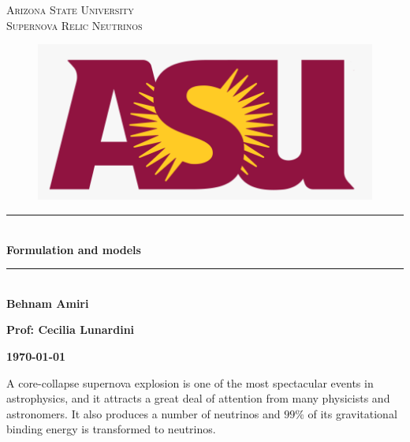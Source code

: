 \documentclass[fleqn]{article}
\begin{document}
  \begin{titlepage}

    \newcommand{\HRule}{\rule{\linewidth}{0.5mm}}

    \center

    \textsc{\LARGE Arizona State University}\\[1.5cm]

    \textsc{\LARGE Supernova Relic Neutrinos}\\[1.5cm]

    \begin{figure}
      \includegraphics[width=\linewidth]{asu.png}
    \end{figure}

    \HRule \\[0.4cm]
    { \huge \bfseries Formulation and models}\\[0.4cm] 
    \HRule \\[1.5cm]

    \textbf{Behnam Amiri}

    \bigbreak

    \textbf{Prof: Cecilia Lunardini}

    \bigbreak

    \textbf{{\large \today}\\[2cm]}

    \vfill

  \end{titlepage}

  A core-collapse supernova explosion is one of the most spectacular events in astrophysics,
  and it attracts a great deal of attention from many physicists and astronomers. It
  also produces a number of neutrinos and $99\%$ of its gravitational binding energy is
  transformed to neutrinos.
\end{document}
